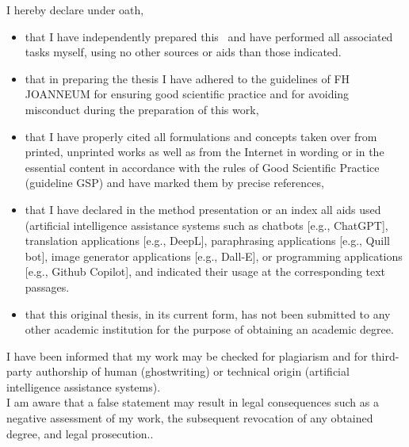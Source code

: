 %


	\thispagestyle{empty}
	
	{\hfill\fontfamily{\sfdefault}\bfseries\fontsize{22}{22}\selectfont{Declaration of Honour}}\vspace*{1cm}
	
	\noindent I hereby declare under oath,
	
	\begin{itemize}
		\item {that I have independently prepared this \DocTypeText~and have performed all associated tasks myself, using no other sources or aids than those indicated.}
		\item {that in preparing the thesis I have adhered to the guidelines of FH JOANNEUM for ensuring good scientific practice and for avoiding misconduct during the preparation of this work,}
		\item {that I have properly cited all formulations and concepts taken over from printed, unprinted works as well as from the Internet in wording or in the essential content in accordance with the rules of Good Scientific Practice (guideline GSP) and have marked them by precise references,}
		\item {that I have declared in the method presentation or an index all aids used (artificial intelligence assistance systems such as chatbots [e.g., ChatGPT], translation applications [e.g., DeepL], paraphrasing applications [e.g., Quill bot], image generator applications [e.g., Dall-E], or programming applications [e.g., Github Copilot], and indicated their usage at the corresponding text passages.}
		\item {that this original thesis, in its current form, has not been submitted to any other academic institution for the purpose of obtaining an academic degree.}
	\end{itemize}
	
	\noindent I have been informed that my work may be checked for plagiarism and for third-party authorship of human (ghostwriting) or technical origin (artificial intelligence assistance systems).\\
	
	\noindent I am aware that a false statement may result in legal consequences such as a negative assessment of my work, the subsequent revocation of any obtained degree, and legal prosecution..
	
	
	\ifthenelse{\equal{\Style}{\Book}}
	{
		\newpage\null\thispagestyle{empty}\newpage
	}
	{
	}
	
